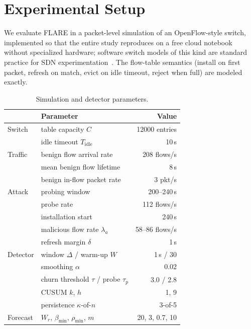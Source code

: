 \documentclass[conference]{IEEEtran}
\begin{document}
\section{Experimental Setup}\label{sec:setup}
We evaluate FLARE in a packet-level simulation of an OpenFlow-style switch,
implemented so that the entire study reproduces on a free cloud notebook
without specialized hardware; software switch models of this kind are standard
practice for SDN experimentation~\cite{lantz2010mininet}. The flow-table
semantics (install on first packet, refresh on match, evict on idle timeout,
reject when full) are modeled exactly.

\begin{table}[t]
\caption{Simulation and detector parameters.}
\label{tab:params}
\centering
\small
\begin{tabular}{@{}llr@{}}
\toprule
 & Parameter & Value \\
\midrule
Switch & table capacity $C$ & 12000 entries \\
 & idle timeout $T_{\mathrm{idle}}$ & 10\,s \\
Traffic & benign flow arrival rate & 208 flows/s \\
 & mean benign flow lifetime & 8\,s \\
 & benign in-flow packet rate & 3 pkt/s \\
Attack & probing window & 200--240\,s \\
 & probe rate & 112 flows/s \\
 & installation start & 240\,s \\
 & malicious flow rate $\lambda_a$ & 58--86 flows/s \\
 & refresh margin $\delta$ & 1\,s \\
Detector & window $\Delta$ / warm-up $W$ & 1\,s / 30 \\
 & smoothing $\alpha$ & 0.02 \\
 & churn threshold $\tau$ / probe $\tau_p$ & 3.0 / 2.8 \\
 & CUSUM $k$, $h$ & 1, 9 \\
 & persistence $\kappa$-of-$n$ & 3-of-5 \\
Forecast & $W_r$, $\beta_{\min}$, $\rho_{\min}$, $m$ & 20, 3, 0.7, 10 \\
\bottomrule
\end{tabular}
\end{table}
\end{document}
